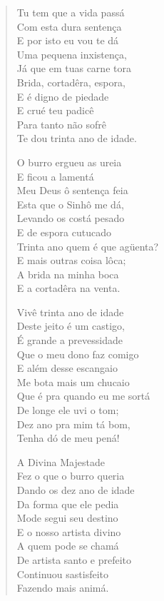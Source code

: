 \begin{verse}
Tu tem que a vida passá\\
Com esta dura sentença\\
E por isto eu vou te dá\\
Uma pequena inxistença,\\
Já que em tuas carne tora\\
Brida, cortadêra, espora,\\
E é digno de piedade\\
E crué teu padicê\\
Para tanto não sofrê\\
Te dou trinta ano de idade.

O burro ergueu as ureia\\
E ficou a lamentá\\
Meu Deus ô sentença feia\\
Esta que o Sinhô me dá,\\
Levando os costá pesado\\
E de espora cutucado\\
Trinta ano quem é que agüenta?\\
E mais outras coisa lôca;\\
A brida na minha boca\\
E a cortadêra na venta.

Vivê trinta ano de idade\\
Deste jeito é um castigo,\\
É grande a prevessidade\\
Que o meu dono faz comigo\\
E além desse escangaio\\
Me bota mais um chucaio\\
Que é pra quando eu me sortá\\
De longe ele uvi o tom;\\
Dez ano pra mim tá bom,\\
Tenha dó de meu pená!

A Divina Majestade\\
Fez o que o burro queria\\
Dando os dez ano de idade\\
Da forma que ele pedia\\
Mode segui seu destino\\
E o nosso artista divino\\
A quem pode se chamá\\
De artista santo e prefeito\\
Continuou sastisfeito\\
Fazendo mais animá.


\end{verse}
